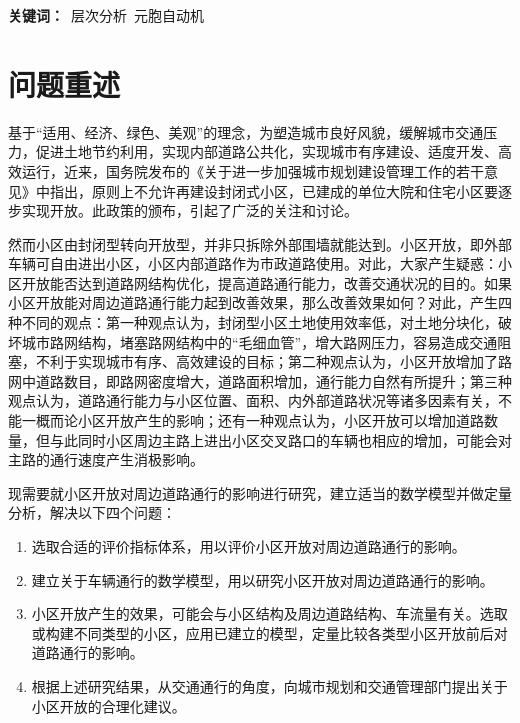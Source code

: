 \documentclass[fontset=windows,a4paper,12pt]{ctexart}
\begin{document}
  \begin{center}
  \end{center}
  \linespread{1.2}
  \begin{center}
  \end{center}
  \textbf{关键词：}\ 层次分析\ 元胞自动机
  
  \section{问题重述}
	基于“适用、经济、绿色、美观”的理念，为塑造城市良好风貌，缓解城市交通压力，促进土地节约利用，实现内部道路公共化，实现城市有序建设、适度开发、高效运行，近来，国务院发布的《关于进一步加强城市规划建设管理工作的若干意见》中指出，原则上不允许再建设封闭式小区，已建成的单位大院和住宅小区要逐步实现开放。此政策的颁布，引起了广泛的关注和讨论。

	然而小区由封闭型转向开放型，并非只拆除外部围墙就能达到。小区开放，即外部车辆可自由进出小区，小区内部道路作为市政道路使用。对此，大家产生疑惑：小区开放能否达到道路网结构优化，提高道路通行能力，改善交通状况的目的。如果小区开放能对周边道路通行能力起到改善效果，那么改善效果如何？对此，产生四种不同的观点：第一种观点认为，封闭型小区土地使用效率低，对土地分块化，破坏城市路网结构，堵塞路网结构中的“毛细血管”，增大路网压力，容易造成交通阻塞，不利于实现城市有序、高效建设的目标；第二种观点认为，小区开放增加了路网中道路数目，即路网密度增大，道路面积增加，通行能力自然有所提升；第三种观点认为，道路通行能力与小区位置、面积、内外部道路状况等诸多因素有关，不能一概而论小区开放产生的影响；还有一种观点认为，小区开放可以增加道路数量，但与此同时小区周边主路上进出小区交叉路口的车辆也相应的增加，可能会对主路的通行速度产生消极影响。

	现需要就小区开放对周边道路通行的影响进行研究，建立适当的数学模型并做定量分析，解决以下四个问题：
\begin{enumerate}
	\item 选取合适的评价指标体系，用以评价小区开放对周边道路通行的影响。
	\item 建立关于车辆通行的数学模型，用以研究小区开放对周边道路通行的影响。
	\item 小区开放产生的效果，可能会与小区结构及周边道路结构、车流量有关。选取或构建不同类型的小区，应用已建立的模型，定量比较各类型小区开放前后对道路通行的影响。
	\item 根据上述研究结果，从交通通行的角度，向城市规划和交通管理部门提出关于小区开放的合理化建议。
\end{enumerate}
\end{document}
